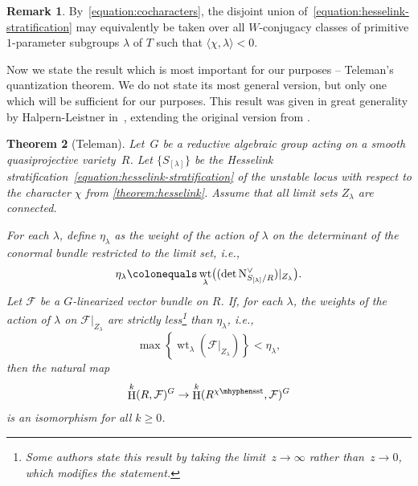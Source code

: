\documentclass[11pt]{article}
\theoremstyle{plain}
\newtheorem{theorem}{Theorem}[section]
\theoremstyle{definition}
\newtheorem{remark}[theorem]{Remark}
\DeclareMathOperator\HH{H}
\DeclareMathOperator\weight{wt}
\newcommand\normal{\ensuremath{\mathrm{N}}}
\newcommand\semistable{\ensuremath{\mhyphen\mathrm{sst}}}
\begin{document}
\begin{remark}
\label{remark:indexing-set}
By~\eqref{equation:cocharacters},
the disjoint union of~\eqref{equation:hesselink-stratification} may equivalently be taken over
all $W$-conjugacy classes of primitive $1$-parameter subgroups $\lambda$ of $T$
such that $\langle \chi,\lambda \rangle < 0$.
\end{remark}

Now we state the result which is most important for our purposes -- Teleman's quantization theorem.
We do not state its most general version, but only one which will be sufficient for our purposes.
This result was given in great generality by Halpern-Leistner in~\cite[Th.\,3.29]{MR3327537},
extending the original version from \cite[Prop.\,2.11 \& Rem.\,2.12(i)]{MR1792291}.

\begin{theorem}[Teleman]
\label{theorem:teleman-quantization}
Let~$G$ be a reductive algebraic group
acting on a smooth quasiprojective variety~$R$.
Let $\{S_{[\lambda]}\}$ be the Hesselink stratification~\eqref{equation:hesselink-stratification} of the unstable locus
with respect to the character $\chi$ from \cref{theorem:hesselink}.
Assume that all limit sets $Z_\lambda$ are connected.

For each $\lambda$, define $\eta_\lambda$ as the weight of the action of $\lambda$
on the determinant of the conormal bundle restricted to the limit set, i.e.,
\begin{equation}
\label{equation:eta-lambda}
\eta_\lambda\colonequals\weight_\lambda \bigl( (\det \normal_{S_{[\lambda]}/R}^\vee) |_{Z_\lambda} \bigr).
\end{equation}
Let $\mathcal{F}$ be a $G$-linearized vector bundle on $R$.
If, for each $\lambda$, the weights of the action of $\lambda$ on $\mathcal{F}|_{Z_\lambda}$
are strictly less\footnote{Some authors state this result
by taking the limit~$z\to\infty$ rather than~$z\to0$,
which modifies the statement.}
than $\eta_\lambda$,
i.e.,
\begin{equation}
\label{equation:teleman-inequality-general}
\max\left\{ \weight_\lambda\left( \mathcal{F}|_{Z_\lambda} \right) \right\}<\eta_\lambda,
\end{equation}
then the natural map
\begin{equation*}
\HH^k(R,\mathcal{F})^G \to \HH^k(R^{\chi\semistable},\mathcal{F})^G
\end{equation*}
is an isomorphism for all $k \geq 0$.
\end{theorem}
\end{document}
